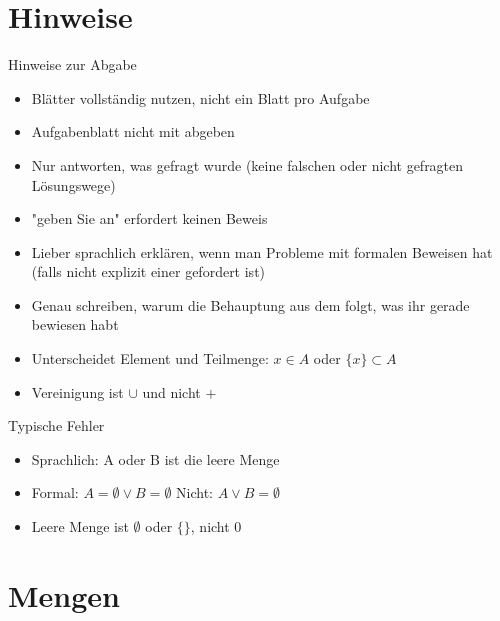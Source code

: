 \documentclass[handout]{beamer}
\begin{document}

\begin{frame}
	\titlepage
\end{frame}

\section{Hinweise}

\begin{frame}{Hinweise zur Abgabe}
	\begin{itemize}
		\item Blätter vollständig nutzen, nicht ein Blatt pro Aufgabe
		\item Aufgabenblatt nicht mit abgeben
		\item Nur antworten, was gefragt wurde (keine falschen oder nicht gefragten Lösungswege)
		\item "geben Sie an" erfordert keinen Beweis
		\item Lieber sprachlich erklären, wenn man Probleme mit formalen Beweisen hat (falls nicht explizit einer gefordert ist)
		\item Genau schreiben, warum die Behauptung aus dem folgt, was ihr gerade bewiesen habt
		\item Unterscheidet Element und Teilmenge: $x \in A$ oder $\{x\} \subset A$
		\item Vereinigung ist $\cup$ und nicht $+$
	\end{itemize}
\end{frame}

\begin{frame}{Typische Fehler}
	\begin{itemize}
		\item Sprachlich: A oder B ist die leere Menge
		\item Formal: $A = \emptyset \lor B = \emptyset$ Nicht: $A \lor B = \emptyset$
		\item Leere Menge ist $\emptyset $ oder $\{\}$, nicht 0
	\end{itemize}
\end{frame}

\section{Mengen}
\end{document}
